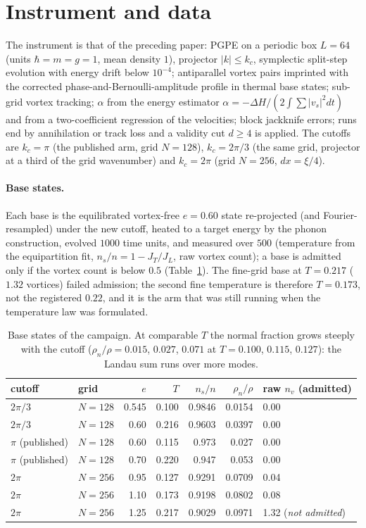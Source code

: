 \documentclass[11pt,a4paper]{article}
\begin{document}
\section{Instrument and data}\label{sec:method}

The instrument is that of the preceding paper: PGPE on a periodic box $L=64$ (units $\hbar=m=g=1$, mean density $1$), projector $|k|\le k_c$, symplectic split-step evolution with energy drift
below $10^{-4}$; antiparallel vortex pairs imprinted with the corrected phase-and-Bernoulli-amplitude profile in thermal base states; sub-grid vortex
tracking; $\alpha$ from the energy estimator $\alpha=-\Delta H/(2\int\!\sum|v_s|^2dt)$ and from a two-coefficient regression of the velocities; block jackknife errors;
runs end by annihilation or track loss and a validity cut $d\ge4$ is applied. The cutoffs are $k_c=\pi$ (the published arm, grid $N=128$), $k_c=2\pi/3$ (the same grid, projector at a third of the grid wavenumber) and $k_c=2\pi$ (grid $N=256$, $dx=\xi/4$).

\paragraph{Base states.} Each base is the equilibrated vortex-free $e=0.60$ state re-projected (and Fourier-resampled) under the new cutoff, heated to a target energy by the phonon construction, evolved
$1000$ time units, and measured over $500$ (temperature from the equipartition fit, $n_s/n=1-J_T/J_L$, raw vortex count); a base is admitted only if the vortex count is below $0.5$
(Table~\ref{tab:bases}). The fine-grid base at $T=0.217$ ($1.32$ vortices) failed admission; the second fine temperature is therefore $T=0.173$, not the registered $0.22$, and it
is the arm that was still running when the temperature law was formulated.

\begin{table}[h]\centering\small
\begin{tabular}{llrrrrl}\toprule
cutoff & grid & $e$ & $T$ & $n_s/n$ & $\rho_n/\rho$ & raw $n_v$ (admitted)\\\midrule
$2\pi/3$ & $N=128$ & 0.545 & 0.100 & 0.9846 & 0.0154 & 0.00\\
$2\pi/3$ & $N=128$ & 0.60 & 0.216 & 0.9603 & 0.0397 & 0.00\\
$\pi$ (published) & $N=128$ & 0.60 & 0.115 & 0.973 & 0.027 & 0.00\\
$\pi$ (published) & $N=128$ & 0.70 & 0.220 & 0.947 & 0.053 & 0.00\\
$2\pi$ & $N=256$ & 0.95 & 0.127 & 0.9291 & 0.0709 & 0.04\\
$2\pi$ & $N=256$ & 1.10 & 0.173 & 0.9198 & 0.0802 & 0.08\\
$2\pi$ & $N=256$ & 1.25 & 0.217 & 0.9029 & 0.0971 & 1.32 (\emph{not admitted})\\\bottomrule
\end{tabular}
\caption{Base states of the campaign. At comparable $T$ the normal fraction grows steeply with the cutoff ($\rho_n/\rho=0.015$, $0.027$, $0.071$ at $T=0.100$, $0.115$, $0.127$): the Landau sum runs over more modes.}\label{tab:bases}
\end{table}
\end{document}
